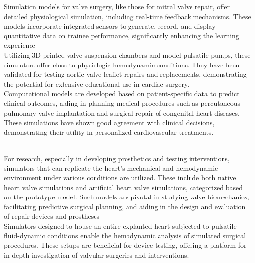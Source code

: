Simulation models for valve surgery, like those for mitral valve repair, offer detailed physiological simulation, including real-time feedback mechanisms. These models incorporate integrated sensors to generate, record, and display quantitative data on trainee performance, significantly enhancing the learning experience ~\\

Utilizing 3D printed valve suspension chambers and model pulsatile pumps, these simulators offer close to physiologic hemodynamic conditions. They have been validated for testing aortic valve leaflet repairs and replacements, demonstrating the potential for extensive educational use in cardiac surgery. ~\\

Computational models are developed based on patient-specific data to predict clinical outcomes, aiding in planning medical procedures such as percutaneous pulmonary valve implantation and surgical repair of congenital heart diseases. These simulations have shown good agreement with clinical decisions, demonstrating their utility in personalized cardiovascular treatments. ~

\\
For research, especially in developing prosthetics and testing interventions, simulators that can replicate the heart's mechanical and hemodynamic environment under various conditions are utilized. These include both native heart valve simulations and artificial heart valve simulations, categorized based on the prototype model. Such models are pivotal in studying valve biomechanics, facilitating predictive surgical planning, and aiding in the design and evaluation of repair devices and prostheses ~\\

Simulators designed to house an entire explanted heart subjected to pulsatile fluid-dynamic conditions enable the hemodynamic analysis of simulated surgical procedures. These setups are beneficial for device testing, offering a platform for in-depth investigation of valvular surgeries and interventions. ~


